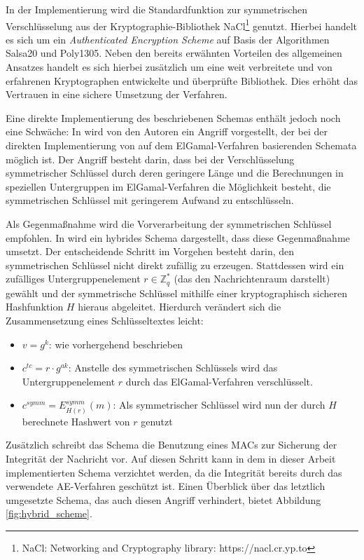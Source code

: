   In der Implementierung wird die Standardfunktion zur symmetrischen Verschlüsselung aus der Kryptographie-Bibliothek NaCl\footnote{
    NaCl: Networking and Cryptography library: https://nacl.cr.yp.to
  } 
  genutzt. Hierbei handelt es sich um ein \textit{Authenticated Encryption Scheme} auf Basis der Algorithmen Salsa20 und Poly1305. Neben den bereits erwähnten Vorteilen des allgemeinen Ansatzes handelt es sich hierbei zusätzlich um eine weit verbreitete und von erfahrenen Kryptographen entwickelte und überprüfte Bibliothek. Dies erhöht das Vertrauen in eine sichere Umsetzung der Verfahren.
  
  Eine direkte Implementierung des beschriebenen Schemas enthält jedoch noch eine Schwäche: In \cite{boneh2000} wird von den Autoren ein Angriff vorgestellt, der bei der direkten Implementierung von auf dem ElGamal-Verfahren basierenden Schemata möglich ist. Der Angriff besteht darin, dass bei der Verschlüsselung symmetrischer Schlüssel durch deren geringere Länge und die Berechnungen in speziellen Untergruppen im ElGamal-Verfahren die Möglichkeit besteht, die symmetrischen Schlüssel mit geringerem Aufwand zu entschlüsseln.
  
  Als Gegenmaßnahme wird die Vorverarbeitung der symmetrischen Schlüssel empfohlen. In \cite{abdalla1999} wird ein hybrides Schema dargestellt, dass diese Gegenmaßnahme umsetzt. Der entscheidende Schritt im Vorgehen besteht darin, den symmetrischen Schlüssel nicht direkt zufällig zu erzeugen. Stattdessen wird ein zufälliges Untergruppenelement \(r \in \mathbb{Z}_q^*\) (das den Nachrichtenraum darstellt) gewählt und der symmetrische Schlüssel mithilfe einer kryptographisch sicheren Hashfunktion \(H\) hieraus abgeleitet. Hierdurch verändert sich die Zusammensetzung eines Schlüsseltextes leicht:
  
  \begin{itemize}
    \item \(v = g^k\): wie vorhergehend beschrieben
    \item \(c^{tc} = r \cdot g^{ak}\): Anstelle des symmetrischen Schlüssels wird das Untergruppenelement \(r\) durch das ElGamal-Verfahren verschlüsselt.
    \item \(c^{symm} = E^{symm}_{H(r)}(m)\): Als symmetrischer Schlüssel wird nun der durch \(H\) berechnete Hashwert von \(r\) genutzt
  \end{itemize}
  
  Zusätzlich schreibt das Schema die Benutzung eines MACs zur Sicherung der Integrität der Nachricht vor. Auf diesen Schritt kann in dem in dieser Arbeit implementierten Schema verzichtet werden, da die Integrität bereits durch das verwendete AE-Verfahren geschützt ist. Einen Überblick über das letztlich umgesetzte Schema, das auch diesen Angriff verhindert, bietet Abbildung \ref{fig:hybrid_scheme}.
  

